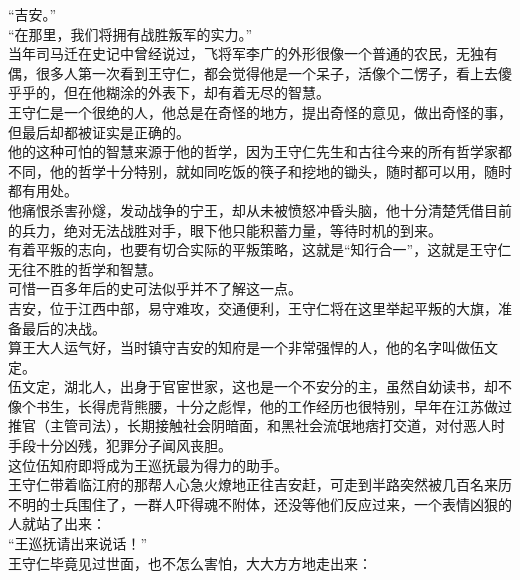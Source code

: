 \begin{multicols}{\theparacolNo}
“吉安。”\\

“在那里，我们将拥有战胜叛军的实力。”\\

当年司马迁在史记中曾经说过，飞将军李广的外形很像一个普通的农民，无独有偶，很多人第一次看到王守仁，都会觉得他是一个呆子，活像个二愣子，看上去傻乎乎的，但在他糊涂的外表下，却有着无尽的智慧。\\

王守仁是一个很绝的人，他总是在奇怪的地方，提出奇怪的意见，做出奇怪的事，但最后却都被证实是正确的。\\

他的这种可怕的智慧来源于他的哲学，因为王守仁先生和古往今来的所有哲学家都不同，他的哲学十分特别，就如同吃饭的筷子和挖地的锄头，随时都可以用，随时都有用处。\\

他痛恨杀害孙燧，发动战争的宁王，却从未被愤怒冲昏头脑，他十分清楚凭借目前的兵力，绝对无法战胜对手，眼下他只能积蓄力量，等待时机的到来。\\

有着平叛的志向，也要有切合实际的平叛策略，这就是“知行合一”，这就是王守仁无往不胜的哲学和智慧。\\

可惜一百多年后的史可法似乎并不了解这一点。\\

吉安，位于江西中部，易守难攻，交通便利，王守仁将在这里举起平叛的大旗，准备最后的决战。\\

算王大人运气好，当时镇守吉安的知府是一个非常强悍的人，他的名字叫做伍文定。\\

伍文定，湖北人，出身于官宦世家，这也是一个不安分的主，虽然自幼读书，却不像个书生，长得虎背熊腰，十分之彪悍，他的工作经历也很特别，早年在江苏做过推官（主管司法），长期接触社会阴暗面，和黑社会流氓地痞打交道，对付恶人时手段十分凶残，犯罪分子闻风丧胆。\\

这位伍知府即将成为王巡抚最为得力的助手。\\

王守仁带着临江府的那帮人心急火燎地正往吉安赶，可走到半路突然被几百名来历不明的士兵围住了，一群人吓得魂不附体，还没等他们反应过来，一个表情凶狠的人就站了出来：\\

“王巡抚请出来说话！”\\

王守仁毕竟见过世面，也不怎么害怕，大大方方地走出来：\\


\end{multicols}
